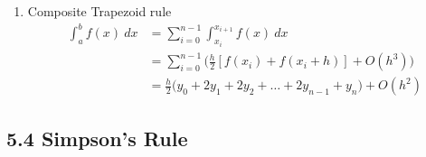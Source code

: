 \documentclass{article}
\theoremstyle{remark}
\begin{document}
\begin{enumerate}
\begin{enumerate}
\begin{enumerate}
\item Composite Trapezoid rule
\begin{equation}\nonumber
\begin{split}
\int_a^b f(x)~dx & = \sum_{i=0}^{n-1}\int_{x_i}^{x_{i+1}}f(x)~dx\\
& = \sum_{i=0}^{n-1}\Big(\frac{h}{2}[f(x_i) + f(x_i+h)]+O(h^3)\Big) \\
& = \frac{h}{2}\Big(y_0+2y_1+2y_2+\dots+2y_{n-1}+y_n\Big) + O(h^2)
\end{split}
\end{equation}
	
\end{enumerate}
\end{enumerate}
\end{enumerate}



\subsection{5.4 Simpson's Rule}
\end{document}
